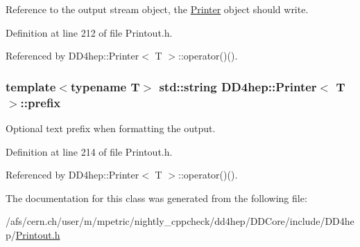 Reference to the output stream object, the \hyperlink{struct_d_d4hep_1_1_printer}{Printer} object should write. 

Definition at line 212 of file Printout.h.

Referenced by DD4hep::Printer$<$ T $>$::operator()().\hypertarget{struct_d_d4hep_1_1_printer_a59b1bd251047feee01c469a91564a320}{
\subsubsection[{prefix}]{\setlength{\rightskip}{0pt plus 5cm}template$<$typename T$>$ std::string {\bf DD4hep::Printer}$<$ {\bf T} $>$::{\bf prefix}}}
\label{struct_d_d4hep_1_1_printer_a59b1bd251047feee01c469a91564a320}


Optional text prefix when formatting the output. 

Definition at line 214 of file Printout.h.

Referenced by DD4hep::Printer$<$ T $>$::operator()().

The documentation for this class was generated from the following file:\begin{DoxyCompactItemize}
\item 
/afs/cern.ch/user/m/mpetric/nightly\_\-cppcheck/dd4hep/DDCore/include/DD4hep/\hyperlink{_printout_8h}{Printout.h}\end{DoxyCompactItemize}
